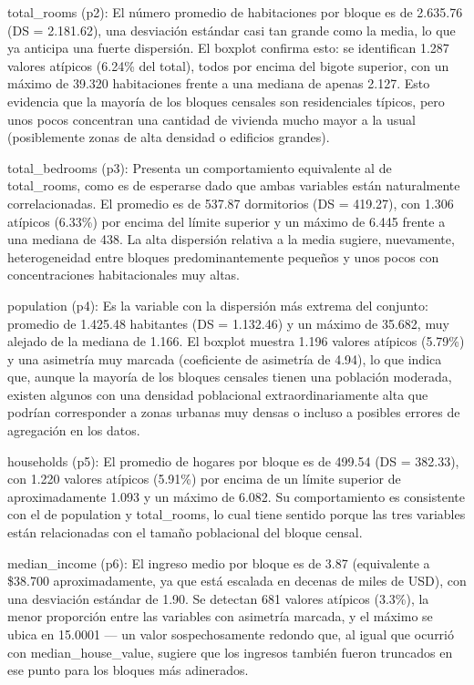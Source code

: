 \documentclass[
]{book}
\begin{document}
total\_rooms (p2): El número promedio de habitaciones por bloque es de 2.635.76 (DS = 2.181.62), una desviación estándar casi tan grande como la media, lo que ya anticipa una fuerte dispersión. El boxplot confirma esto: se identifican 1.287 valores atípicos (6.24\% del total), todos por encima del bigote superior, con un máximo de 39.320 habitaciones frente a una mediana de apenas 2.127. Esto evidencia que la mayoría de los bloques censales son residenciales típicos, pero unos pocos concentran una cantidad de vivienda mucho mayor a la usual (posiblemente zonas de alta densidad o edificios grandes).

total\_bedrooms (p3): Presenta un comportamiento equivalente al de total\_rooms, como es de esperarse dado que ambas variables están naturalmente correlacionadas. El promedio es de 537.87 dormitorios (DS = 419.27), con 1.306 atípicos (6.33\%) por encima del límite superior y un máximo de 6.445 frente a una mediana de 438. La alta dispersión relativa a la media sugiere, nuevamente, heterogeneidad entre bloques predominantemente pequeños y unos pocos con concentraciones habitacionales muy altas.

population (p4): Es la variable con la dispersión más extrema del conjunto: promedio de 1.425.48 habitantes (DS = 1.132.46) y un máximo de 35.682, muy alejado de la mediana de 1.166. El boxplot muestra 1.196 valores atípicos (5.79\%) y una asimetría muy marcada (coeficiente de asimetría de 4.94), lo que indica que, aunque la mayoría de los bloques censales tienen una población moderada, existen algunos con una densidad poblacional extraordinariamente alta que podrían corresponder a zonas urbanas muy densas o incluso a posibles errores de agregación en los datos.

households (p5): El promedio de hogares por bloque es de 499.54 (DS = 382.33), con 1.220 valores atípicos (5.91\%) por encima de un límite superior de aproximadamente 1.093 y un máximo de 6.082. Su comportamiento es consistente con el de population y total\_rooms, lo cual tiene sentido porque las tres variables están relacionadas con el tamaño poblacional del bloque censal.

median\_income (p6): El ingreso medio por bloque es de 3.87 (equivalente a \$38.700 aproximadamente, ya que está escalada en decenas de miles de USD), con una desviación estándar de 1.90. Se detectan 681 valores atípicos (3.3\%), la menor proporción entre las variables con asimetría marcada, y el máximo se ubica en 15.0001 --- un valor sospechosamente redondo que, al igual que ocurrió con median\_house\_value, sugiere que los ingresos también fueron truncados en ese punto para los bloques más adinerados.
\end{document}
